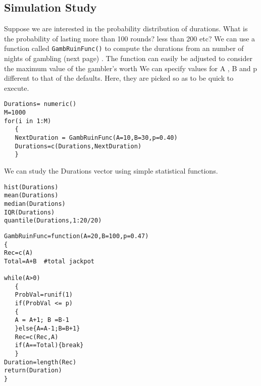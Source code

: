 \documentclass[11pt]{article} %
\begin{document}
\subsection{Simulation Study}
Suppose we are interested in the probability distribution of durations. What is the probability of lasting more than 100 rounds? less than 200 etc? We can use a function called \texttt{GambRuinFunc()} to compute the durations from an number of nights of gambling (next page) . The function can easily be adjusted to consider the maximum value of the gambler's worth
We can specify values for A , B and p different to that of the defaults. Here, they are picked so as to be quick to execute.
\begin{framed}
\begin{verbatim}
Durations= numeric()
M=1000
for(i in 1:M)
   {
   NextDuration = GambRuinFunc(A=10,B=30,p=0.40)
   Durations=c(Durations,NextDuration)
   } 
\end{verbatim}
\end{framed}

We can study the Durations vector  using simple statistical functions.
\begin{framed}
\begin{verbatim}
hist(Durations)
mean(Durations)
median(Durations)
IQR(Durations)
quantile(Durations,1:20/20)
\end{verbatim}
\end{framed}


\newpage
\begin{framed}
\begin{verbatim}
GambRuinFunc=function(A=20,B=100,p=0.47)
{
Rec=c(A)
Total=A+B  #total jackpot

while(A>0)
   { 
   ProbVal=runif(1)
   if(ProbVal <= p)
   {
   A = A+1; B =B-1
   }else{A=A-1;B=B+1}
   Rec=c(Rec,A)
   if(A==Total){break}
   }
Duration=length(Rec)
return(Duration)
}
\end{verbatim}
\end{framed}

\end{document}
